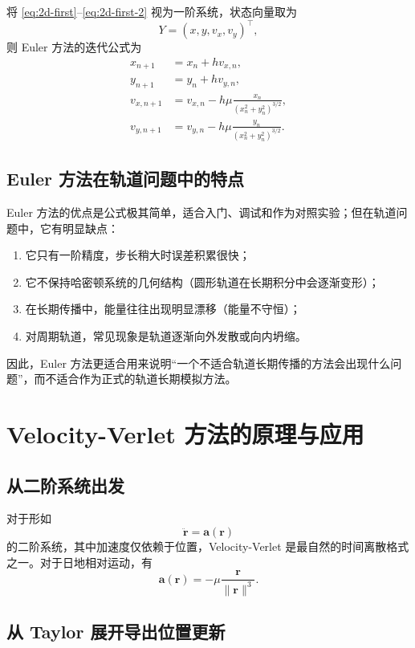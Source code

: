 将 \eqref{eq:2d-first}--\eqref{eq:2d-first-2} 视为一阶系统，状态向量取为
\[
Y=(x,y,v_x,v_y)^\top,
\]
则 Euler 方法的迭代公式为
\begin{align}
 x_{n+1} &= x_n+h v_{x,n},\label{eq:euler-x}\\
 y_{n+1} &= y_n+h v_{y,n},\label{eq:euler-y}\\
 v_{x,n+1} &= v_{x,n}-h\mu \frac{x_n}{(x_n^2+y_n^2)^{3/2}},\label{eq:euler-vx}\\
 v_{y,n+1} &= v_{y,n}-h\mu \frac{y_n}{(x_n^2+y_n^2)^{3/2}}.\label{eq:euler-vy}
\end{align}

\subsection{Euler 方法在轨道问题中的特点}

Euler 方法的优点是公式极其简单，适合入门、调试和作为对照实验；但在轨道问题中，它有明显缺点：
\begin{enumerate}[label=\arabic*.]
  \item 它只有一阶精度，步长稍大时误差积累很快；
  \item 它不保持哈密顿系统的几何结构（圆形轨道在长期积分中会逐渐变形）；
  \item 在长期传播中，能量往往出现明显漂移（能量不守恒）；
  \item 对周期轨道，常见现象是轨道逐渐向外发散或向内坍缩。
\end{enumerate}
因此，Euler 方法更适合用来说明“一个不适合轨道长期传播的方法会出现什么问题”，而不适合作为正式的轨道长期模拟方法。

\section{Velocity-Verlet 方法的原理与应用}

\subsection{从二阶系统出发}

对于形如
\[
\ddot{\bm r}=\bm a(\bm r)
\]
的二阶系统，其中加速度仅依赖于位置，Velocity-Verlet 是最自然的时间离散格式之一。对于日地相对运动，有
\[
\bm a(\bm r)=-\mu \frac{\bm r}{\|\bm r\|^3}.
\]

\subsection{从 Taylor 展开导出位置更新}

